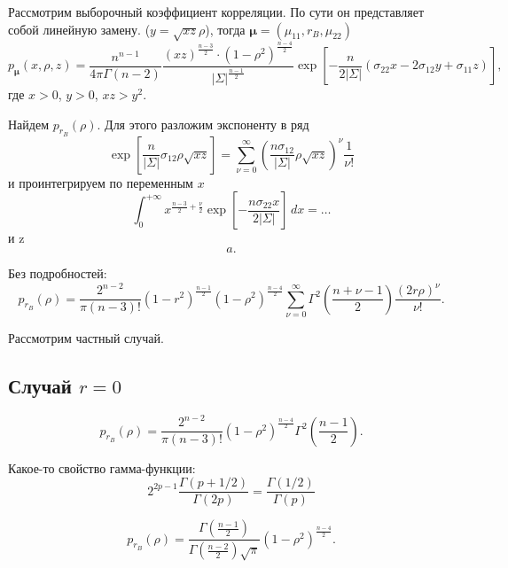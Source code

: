 \begin{corollary*}
  Рассмотрим выборочный коэффициент корреляции. По сути он представляет собой линейную замену.
  ($y = \sqrt{xz} \rho$),
  тогда $\bm \mu = (\mu_{11}, r_B, \mu_{22})$
  \[
    p_{\bm\mu} (x, \rho, z) = 
    \frac{n^{n-1}}{4\pi \Gamma(n-2)}
    \frac{(xz)^\frac{n-3}{2} \cdot (1-\rho^2)^\frac{n-4}{2}}{|\Sigma|^\frac{n-1}{2}}
    \exp\left[-\frac{n}{2 |\Sigma|} (\sigma_{22} x - 2 \sigma_{12}y +
    \sigma_{11} z) \right],
  \]
  где $x>0$, $y>0$, $xz>y^2$.

  Найдем $p_{r_B} (\rho)$.
  Для этого разложим экспоненту в ряд
  \[
    \exp\left[ \frac{n}{|\Sigma|} \sigma_{12} \rho \sqrt{xz} \right]
    = \sum_{\nu=0}^\infty \left(\frac{n \sigma_{12}}{|\Sigma|} \rho \sqrt{xz}
    \right)^\nu \frac{1}{\nu!}
  \]
  и проинтегрируем по переменным $ x $
  \[
    \int_0^{+\infty} x^{\frac{n-3}{2} + \frac{\nu}{2}} \exp\left[-\frac{n
    \sigma_{22} x}{2 |\Sigma|}\right] \, dx = \dots %
  \]
  и z  
  \[
      a.
  \]
  

  Без подробностей:
  \[
    p_{r_B} (\rho) = \frac{2^{n-2}}{\pi (n-3)!}
    (1 - r^2)^{\frac{n-1}{2}}
    (1-\rho^2)^{\frac{n-4}{2}}
    \sum_{\nu=0}^\infty \Gamma^2\left(\frac{n+\nu-1}{2}\right) \frac{(2 r
    \rho)^\nu}{\nu!}.
  \]
\end{corollary*}

Рассмотрим частный случай.
\subsection{Случай $r = 0$}

\[
  p_{r_B} (\rho) = \frac{2^{n-2}}{\pi (n-3)!}
  (1-\rho^2)^{\frac{n-4}{2}}
  \Gamma^2\left(\frac{n-1}{2}\right).
\]

Какое-то свойство гамма-функции:
\[
  2^{2p-1} \frac{\Gamma(p+1/2)}{\Gamma(2p)} = \frac{\Gamma(1/2)}{\Gamma(p)}
\]

\[
  p_{r_B} (\rho) = \frac{\Gamma(\frac{n-1}{2})}{\Gamma(\frac{n-2}{2}) \sqrt{\pi}} (1-\rho^2)^{\frac{n-4}{2}}.
\]

